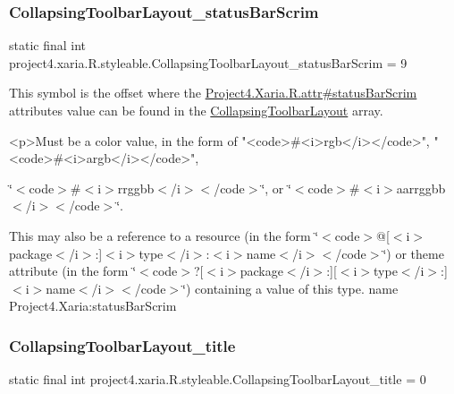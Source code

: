 \subsubsection{\texorpdfstring{Collapsing\+Toolbar\+Layout\+\_\+status\+Bar\+Scrim}{CollapsingToolbarLayout\_statusBarScrim}}
{\footnotesize\ttfamily static final int project4.\+xaria.\+R.\+styleable.\+Collapsing\+Toolbar\+Layout\+\_\+status\+Bar\+Scrim = 9\hspace{0.3cm}{\ttfamily [static]}}

This symbol is the offset where the \hyperlink{}{Project4.\+Xaria.\+R.\+attr\#status\+Bar\+Scrim} attribute\textquotesingle{}s value can be found in the \hyperlink{classproject4_1_1xaria_1_1R_1_1styleable_ac131ed2b7e0e7f05b58231242478b839}{Collapsing\+Toolbar\+Layout} array.

\begin{DoxyVerb}      <p>Must be a color value, in the form of "<code>#<i>rgb</i></code>", "<code>#<i>argb</i></code>",
\end{DoxyVerb}
 \char`\"{}$<$code$>$\#$<$i$>$rrggbb$<$/i$>$$<$/code$>$\char`\"{}, or \char`\"{}$<$code$>$\#$<$i$>$aarrggbb$<$/i$>$$<$/code$>$\char`\"{}. 

This may also be a reference to a resource (in the form \char`\"{}$<$code$>$@\mbox{[}$<$i$>$package$<$/i$>$\+:\mbox{]}$<$i$>$type$<$/i$>$\+:$<$i$>$name$<$/i$>$$<$/code$>$\char`\"{}) or theme attribute (in the form \char`\"{}$<$code$>$?\mbox{[}$<$i$>$package$<$/i$>$\+:\mbox{]}\mbox{[}$<$i$>$type$<$/i$>$\+:\mbox{]}$<$i$>$name$<$/i$>$$<$/code$>$\char`\"{}) containing a value of this type.  name Project4.\+Xaria\+:status\+Bar\+Scrim \mbox{\label{classproject4_1_1xaria_1_1R_1_1styleable_a16736e7389574011ed56270a9c883976}} 
\subsubsection{\texorpdfstring{Collapsing\+Toolbar\+Layout\+\_\+title}{CollapsingToolbarLayout\_title}}
{\footnotesize\ttfamily static final int project4.\+xaria.\+R.\+styleable.\+Collapsing\+Toolbar\+Layout\+\_\+title = 0\hspace{0.3cm}{\ttfamily [static]}}

